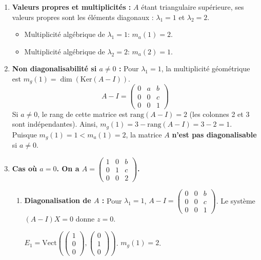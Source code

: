 \documentclass[french]{yLectureNote}
\begin{document}
\begin{enumerate}
    \item \textbf{Valeurs propres et multiplicités :}
    $A$ étant triangulaire supérieure, ses valeurs propres sont les éléments diagonaux : $\lambda_1 = 1$ et $\lambda_2 = 2$.
    \begin{itemize}
        \item Multiplicité algébrique de $\lambda_1 = 1$: $m_a(1) = 2$.
        \item Multiplicité algébrique de $\lambda_2 = 2$: $m_a(2) = 1$.
    \end{itemize}

    \item \textbf{Non diagonalisabilité si $a\ne0$ :}
    Pour $\lambda_1 = 1$, la multiplicité géométrique est $m_g(1) = \dim(\text{Ker}(A - I))$.
    $$A - I = \begin{pmatrix} 0&a&b\\ 0&0&c\\ 0&0&1 \end{pmatrix}$$
    Si $a \ne 0$, le rang de cette matrice est $\text{rang}(A - I) = 2$ (les colonnes 2 et 3 sont indépendantes).
    Ainsi, $m_g(1) = 3 - \text{rang}(A - I) = 3 - 2 = 1$.
    Puisque $m_g(1)=1 < m_a(1)=2$, la matrice $A$ \textbf{n'est pas diagonalisable} si $a \ne 0$.

    \item \textbf{Cas où $a=0$. On a $A=\begin{pmatrix}1&0&b\\ 0&1&c\\ 0&0&2\end{pmatrix}$.}
    \begin{enumerate}
        \item \textbf{Diagonalisation de $A$ :}
        Pour $\lambda_1 = 1$, $A - I = \begin{pmatrix} 0&0&b\\ 0&0&c\\ 0&0&1 \end{pmatrix}$. Le système $(A-I)X=0$ donne $z=0$.

        $E_1 = \text{Vect}\left(\begin{pmatrix}1\\ 0\\ 0\end{pmatrix}, \begin{pmatrix}0\\ 1\\ 0\end{pmatrix}\right)$. $m_g(1) = 2$.


\end{enumerate}
\end{enumerate}
\end{document}
